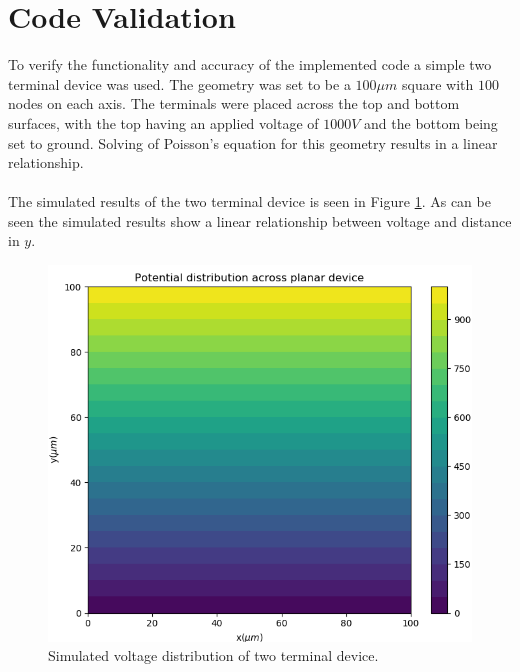 \documentclass{article}[12pt]
\begin{document}
\section{Code Validation}
	To verify the functionality and accuracy of the implemented code a simple two terminal device was used. The geometry was set to be a $100\mu m$ square with $100$ nodes on each axis. The terminals were placed across the top and bottom surfaces, with the top having an applied voltage of $1000V$ and the bottom being set to ground. Solving of Poisson's equation for this geometry results in a linear relationship. \\ \\
 	\noindent
 The simulated results of the two terminal device is seen in Figure \ref{fig:two_terminal}. As can be seen the simulated results show a linear relationship between voltage and distance in $y$.
 
 \begin{figure}[h!]
 	\centering
 	\includegraphics[width=\linewidth]{two_terminal1.png}
 	\caption{Simulated voltage distribution of two terminal device.}
 	\label{fig:two_terminal}
\end{figure}
\end{document}
